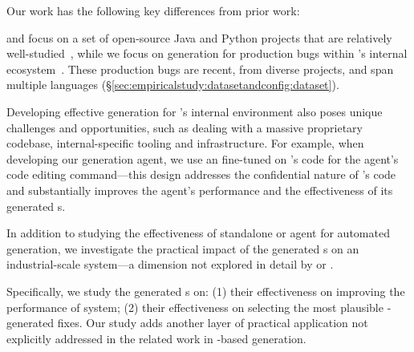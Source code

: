 Our work has the following key differences from prior work:

\libro and \swtbench focus on a set of open-source Java and Python projects that are relatively well-studied~\cite{yang2024swe,Ernst2014Defects4J}, while we focus on \brt generation for production bugs within \google's internal ecosystem~\cite{rondon2025passerine}.
These production bugs are recent, from diverse projects, and span multiple languages (\S\ref{sec:empiricalstudy:datasetandconfig:dataset}).

Developing effective \brt generation for \google's internal environment also poses unique challenges and opportunities, such as dealing with a massive proprietary codebase, internal-specific tooling and infrastructure.
For example, when developing our \brt generation agent, we use an \llm fine-tuned on \google's code for the agent's code editing command---this design addresses the confidential nature of \google's code and substantially improves the agent's performance and the effectiveness of its generated \brt{}s.


In addition to studying the effectiveness of standalone \llm or \llm agent for automated \brt generation, we investigate the practical impact of the generated \brt{}s on an industrial-scale \autopr system---a dimension not explored in detail by \libro or \swtbench.

Specifically, we study the generated \brt{}s on: (1) their effectiveness on improving the performance of \autopr system; (2) their effectiveness on selecting the most plausible \autopr-generated fixes.
Our study adds another layer of practical application not explicitly addressed in the related work in \llm-based \brt generation.